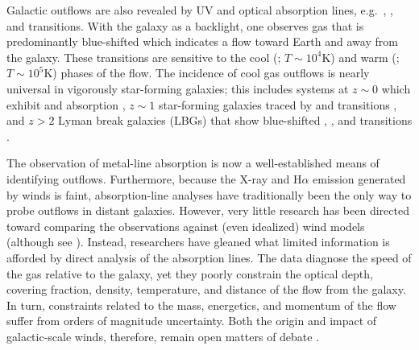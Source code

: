 \documentclass[12pt,preprint]{aastex}
\begin{document}
Galactic outflows are also
revealed by UV and optical absorption lines, e.g.\ ,
,  and  transitions.  With the galaxy
as a backlight, one observes gas that is predominantly
blue-shifted which indicates a flow toward
Earth and away from the galaxy.  These transitions are sensitive to
the cool (; $T \sim 10^4$K) and warm (; $T \sim
10^5$K) phases of the flow.  
The incidence of cool gas outflows is
nearly universal in 
vigorously
star-forming galaxies;  this includes systems at $z \sim 0$
which exhibit  and  absorption
\citep{rvs05a,martin05,smn+09,mb09,cth+10}, 
$z \sim 1$ star-forming galaxies traced by
 and  transitions \citep{wcp+09,rwk+10}, and
$z>2$ Lyman break galaxies (LBGs) that show blue-shifted ,
, and  transitions \citep{sgp+96,lkg+97,shapley03}.

The observation of metal-line absorption is now a well-established
means of identifying outflows.  Furthermore, because the X-ray and
H$\alpha$ emission generated by winds is faint, absorption-line
analyses have traditionally been the only way to probe outflows in
distant galaxies. However, very little research
has been directed
toward comparing the observations against (even idealized) wind
models (although see \citealt{fmm+09}).  
Instead, researchers have gleaned what limited information
is afforded by direct analysis of the absorption lines.  The data
diagnose the speed of the gas relative to the galaxy, 
yet they poorly constrain the
optical depth, covering fraction, density, temperature, and distance
of the flow from the galaxy.   In turn, constraints related to the
mass, energetics, and momentum of the flow suffer from
orders of magnitude uncertainty.  Both the origin and impact of
galactic-scale winds, therefore, remain open matters of debate
\citep{mqt05,sdr08,sh09,ssr02,od06,kkd+09}.
\end{document}
